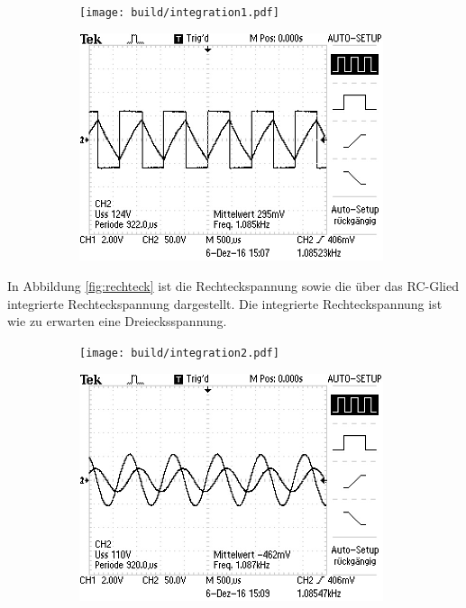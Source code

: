 \begin{figure}
	\caption{Aufgabenteil d: Rechteckspannung}
	\label{fig:rechteck}
	\centering
	\begin{subfigure}{0.48\textwidth}
		\centering
		\texttt{[image: build/integration1.pdf]}
		\label{fig:intrechteck}
	\end{subfigure}
	\begin{subfigure}{0.48\textwidth}
		\centering
		\includegraphics[width=0.98\textwidth]{bilder/ALL0001/F0001TEK.JPG}
	\end{subfigure}
\end{figure}
In Abbildung \ref{fig:rechteck} ist die Rechteckspannung sowie die über das RC-Glied integrierte Rechteckspannung dargestellt.
Die integrierte Rechteckspannung ist wie zu erwarten eine Dreiecksspannung.
\begin{figure}
	\caption{Aufgabenteil d: Sinusspannung}
	\label{fig:sinus}
	\centering
	\begin{subfigure}{0.48\textwidth}
		\centering
		\texttt{[image: build/integration2.pdf]}
		\label{fig:intsinus}
	\end{subfigure}
	\begin{subfigure}{0.48\textwidth}
		\centering
		\includegraphics[width=0.98\textwidth]{bilder/ALL0002/F0002TEK.JPG}
	\end{subfigure}
\end{figure}

